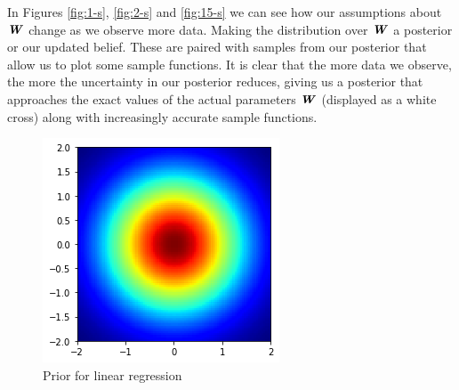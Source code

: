 \documentclass{article}
\newcommand{\mat}[1]{\textbf{\textit{#1}}}
\begin{document}
In Figures \ref{fig:1-s}, \ref{fig:2-s} and \ref{fig:15-s} we can see how our assumptions about $\mat{W}$ change as we observe more data. Making the distribution over $\mat{W}$ a posterior or our updated belief. These are paired with samples from our posterior that allow us to plot some sample functions. It is clear that the more data we observe, the more the uncertainty in our posterior reduces, giving us a posterior that approaches the exact values of the actual parameters $\mat{W}$ (displayed as a white cross) along with increasingly accurate sample functions.
\begin{figure}[H]
	\centering
	\includegraphics[width=0.3\linewidth]{prior}
	\caption{Prior for linear regression}
	\label{fig:prior}
\end{figure}
\end{document}
